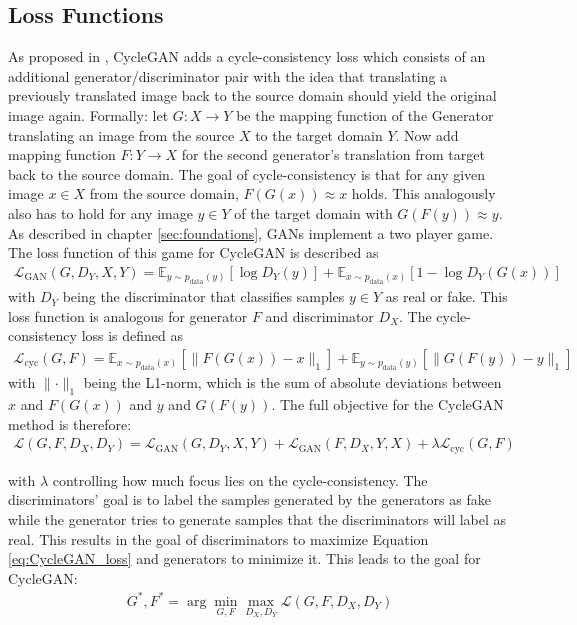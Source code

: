 \subsection{Loss Functions}
As proposed in \cite{DBLP:journals/corr/ZhuPIE17}, CycleGAN adds a cycle-consistency loss which consists of an additional generator/discriminator pair with the idea that translating a previously translated image back to the source domain should yield the original image again. Formally: let $G: X \rightarrow Y$ be the mapping function of the Generator translating an image from the source $X$ to the target domain $Y$. Now add mapping function $F: Y \rightarrow X$ for the second generator's translation from target back to the source domain. The goal of cycle-consistency is that for any given image $x\in X$ from the source domain, $F(G(x)) \approx x$ holds. This analogously also has to hold for any image $y \in Y$ of the target domain with $G(F(y)) \approx y$. As described in chapter \ref{sec:foundations}, GANs implement a two player game. 
The loss function of this game for CycleGAN is described as
\begin{align}
\mathcal{L}_{\text{GAN}}(G, D_Y, X, Y) = \mathbb{E}_{y\sim p_{\text{data}}(y)}[\log D_Y(y)] + \mathbb{E}_{x\sim p_{\text{data}}(x)}[1 - \log D_Y(G(x))]
\end{align}
with $D_Y$ being the discriminator that classifies samples $y \in Y$ as real or fake. This loss function is analogous for generator $F$ and discriminator $D_X$. The cycle-consistency loss is defined as
\begin{align}
\mathcal{L}_{\text{cyc}}(G, F) =  \mathbb{E}_{x\sim p_{\text{data}}(x)} [\lVert F(G(x))- x \rVert_1] + \mathbb{E}_{y\sim p_{\text{data}}(y)} [\lVert G(F(y))- y \rVert_1] \label{eq:GAN_loss}
\end{align}
with $\lVert \cdot \rVert_1$ being the L1-norm, which is the sum of absolute deviations between $x$ and $F(G(x))$ and $y$ and $G(F(y))$. The full objective for the CycleGAN method is therefore:
\begin{align}
\mathcal{L}(G,F,D_X,D_Y) = \mathcal{L}_{\text{GAN}}(G, D_Y, X, Y) + \mathcal{L}_{\text{GAN}}(F, D_X, Y, X) + \lambda \mathcal{L}_{\text{cyc}}(G, F) \label{eq:CycleGAN_loss}
\end{align}

with $\lambda$ controlling how much focus lies on the cycle-consistency. The discriminators' goal is to label the samples generated by the generators as fake while the generator tries to generate samples that the discriminators will label as real. This results in the goal of discriminators to maximize Equation \ref{eq:CycleGAN_loss} and generators to minimize it. This leads to the goal for CycleGAN: 
\begin{align}
G^*, F^* = \arg \underset{G,F}{\min}\underset{D_X, D_Y}{\max} \mathcal{L}(G,F,D_X,D_Y) \label{eq:GAN_goal}
\end{align}

